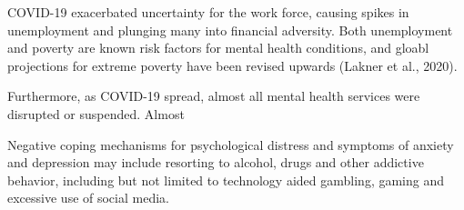     COVID-19 exacerbated uncertainty for the work force, causing spikes in unemployment and plunging many into financial adversity. Both unemployment and poverty are known risk factors for mental health conditions, and gloabl projections for extreme poverty have been revised upwards (Lakner et al., 2020). 

    Furthermore, as COVID-19 spread, almost all mental health services were disrupted or suspended. Almost 

    Negative coping mechanisms for psychological distress and symptoms of anxiety and depression may include resorting to alcohol, drugs and other addictive behavior, including but not limited to technology aided gambling, gaming and excessive use of social media. 


